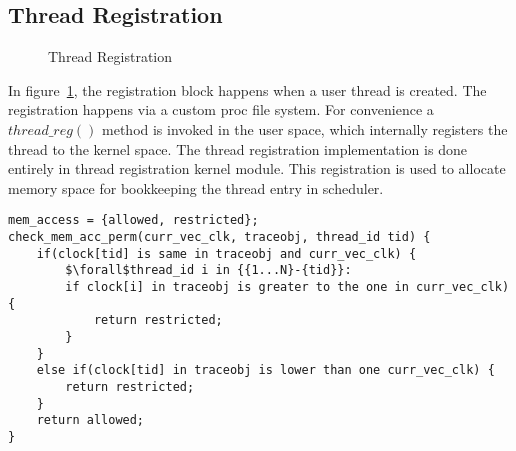 \subsection{Thread Registration}

\begin{figure}[h]
\centering
{}
\caption{Thread Registration}
\label{thread_reg}
\end{figure}
In figure~\ref{thread_reg}, the registration block happens when a user thread is created. 
The registration happens via a custom proc file system. 
For convenience a $thread\_reg()$ method is invoked in the user space, which internally registers the thread to the kernel space. 
The thread registration implementation is done entirely in thread registration kernel module. 
This registration is used to allocate memory space for bookkeeping the thread entry in scheduler. 
\begin{lstlisting}[mathescape=true,style=customc,caption={Pseudo Code for checking memory access permission},frame=tlrb,label={lst:check_perm}]
mem_access = {allowed, restricted};
check_mem_acc_perm(curr_vec_clk, traceobj, thread_id tid) {
	if(clock[tid] is same in traceobj and curr_vec_clk) {
		$\forall$thread_id i in {{1...N}-{tid}}:
		if clock[i] in traceobj is greater to the one in curr_vec_clk) {
			return restricted;		
		}	
	}
	else if(clock[tid] in traceobj is lower than one curr_vec_clk) {
		return restricted;	
	}
	return allowed;
}
\end{lstlisting}


